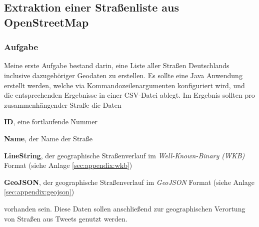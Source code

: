 \subsection{Extraktion einer Straßenliste aus OpenStreetMap}

\subsubsection{Aufgabe}
Meine erste Aufgabe bestand darin, eine Liste aller Straßen Deutschlands inclusive dazugehöriger Geodaten zu erstellen.
Es sollte eine Java Anwendung erstellt werden, welche via Kommandozeilenargumenten konfiguriert wird, und die entsprechenden Ergebnisse in einer CSV-Datei ablegt.
Im Ergebnis sollten pro zusammenhängender Straße die Daten
\begin{compactitem}
  \item \textbf{ID}, eine fortlaufende Nummer
  \item \textbf{Name}, der Name der Straße
  \item \textbf{LineString}, der geographische Straßenverlauf im \textit{Well-Known-Binary (WKB)} Format (siehe Anlage \ref{sec:appendix:wkb})
  \item \textbf{GeoJSON}, der geographische Straßenverlauf im \textit{GeoJSON} Format (siehe Anlage \ref{sec:appendix:geojson})
\end{compactitem}
vorhanden sein.
Diese Daten sollen anschließend zur geographischen Verortung von Straßen aus Tweets genutzt werden.

